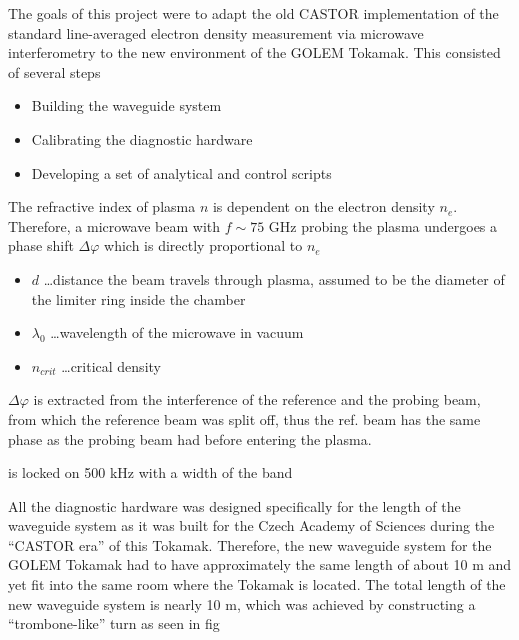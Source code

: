 \documentclass[portrait,final,a0paper]{baposter}
\begin{document}
\begin{poster}
{The goals of this project were to adapt the old CASTOR implementation of the standard line-averaged electron density measurement via microwave interferometry to the new environment of the GOLEM Tokamak. This consisted of several steps
\begin{itemize}
    \item Building the waveguide system
    \item Calibrating the diagnostic hardware 
    \item Developing a set of analytical and control scripts
\end{itemize}
 }

 {
The refractive index of plasma $n$ is dependent on the electron density $n_e$. Therefore, a microwave beam with $f \sim 75$ GHz probing the plasma undergoes a phase shift $\Delta \varphi$ which is directly proportional to $n_e$
\begin{itemize}
    \item $d$ \dots distance the beam travels through plasma, assumed to be the diameter of the limiter ring inside the chamber
    \item $\lambda_0$ \dots wavelength of the microwave in vacuum
    \item $n_{crit}$ \dots critical density 
\end{itemize}
$\Delta \varphi$ is extracted from the interference of the reference and the probing beam, from which the reference beam was split off, thus the ref. beam has the same phase as the probing beam had before entering the plasma.
 }
 {
 
 is locked on 500 kHz with a width of the band
 }



{
 All the diagnostic hardware was designed specifically for the length of the waveguide system as it was built for the Czech Academy of Sciences during the ``CASTOR era'' of this Tokamak. Therefore, the new waveguide system for the GOLEM Tokamak had to have approximately the same length of about 10 m and yet fit into the same room where the Tokamak is located.
The total length of the new waveguide system is nearly 10 m, which was achieved by constructing a ``trombone-like'' turn as seen in fig %
}

 {
 }


\end{poster}
\end{document}
